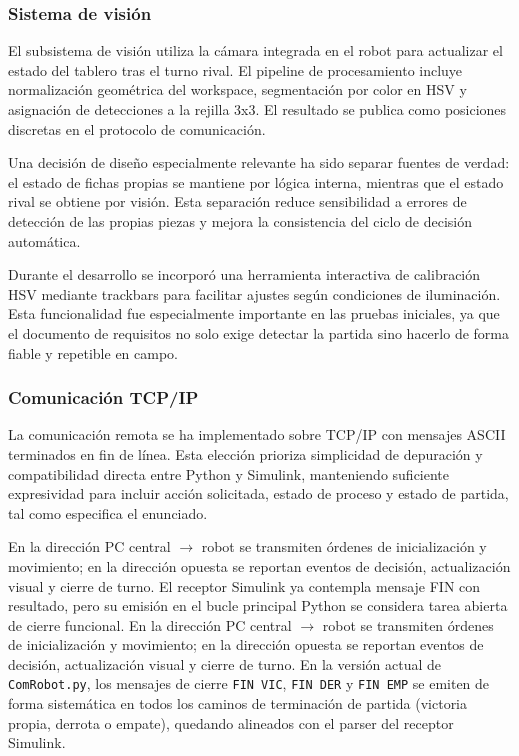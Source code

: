 \documentclass[12pt,a4paper]{article}
\begin{document}
\subsubsection{Sistema de visión}
El subsistema de visión utiliza la cámara integrada en el robot para actualizar el estado del tablero tras el turno rival. El pipeline de procesamiento incluye normalización geométrica del workspace, segmentación por color en HSV y asignación de detecciones a la rejilla 3x3. El resultado se publica como posiciones discretas en el protocolo de comunicación.
\par
Una decisión de diseño especialmente relevante ha sido separar fuentes de verdad: el estado de fichas propias se mantiene por lógica interna, mientras que el estado rival se obtiene por visión. Esta separación reduce sensibilidad a errores de detección de las propias piezas y mejora la consistencia del ciclo de decisión automática.

Durante el desarrollo se incorporó una herramienta interactiva de calibración HSV mediante trackbars para facilitar ajustes según condiciones de iluminación. Esta funcionalidad fue especialmente importante en las pruebas iniciales, ya que el documento de requisitos no solo exige detectar la partida sino hacerlo de forma fiable y repetible en campo.

\subsubsection{Comunicación TCP/IP}
La comunicación remota se ha implementado sobre TCP/IP con mensajes ASCII terminados en fin de línea. Esta elección prioriza simplicidad de depuración y compatibilidad directa entre Python y Simulink, manteniendo suficiente expresividad para incluir acción solicitada, estado de proceso y estado de partida, tal como especifica el enunciado.
\par
En la dirección PC central $\rightarrow$ robot se transmiten órdenes de inicialización y movimiento; en la dirección opuesta se reportan eventos de decisión, actualización visual y cierre de turno. El receptor Simulink ya contempla mensaje FIN con resultado, pero su emisión en el bucle principal Python se considera tarea abierta de cierre funcional.
En la dirección PC central $\rightarrow$ robot se transmiten órdenes de inicialización y movimiento; en la dirección opuesta se reportan eventos de decisión, actualización visual y cierre de turno. En la versión actual de \texttt{ComRobot.py}, los mensajes de cierre \texttt{FIN VIC}, \texttt{FIN DER} y \texttt{FIN EMP} se emiten de forma sistemática en todos los caminos de terminación de partida (victoria propia, derrota o empate), quedando alineados con el parser del receptor Simulink.
\end{document}
